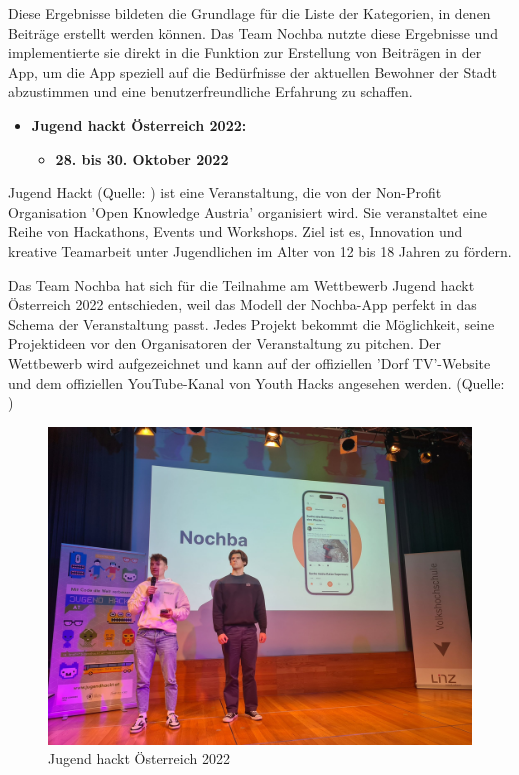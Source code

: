Diese Ergebnisse bildeten die Grundlage für die Liste der Kategorien, in denen Beiträge erstellt werden können. Das Team Nochba nutzte diese Ergebnisse und implementierte sie direkt in die Funktion zur Erstellung von Beiträgen in der App, um die App speziell auf die Bedürfnisse der aktuellen Bewohner der Stadt abzustimmen und eine benutzerfreundliche Erfahrung zu schaffen.

\begin{itemize}
    \item \textbf{Jugend hackt Österreich 2022:}
          \begin{itemize}
              \item \textbf{28. bis 30. Oktober 2022}
          \end{itemize}
\end{itemize}

Jugend Hackt (Quelle: ) ist eine Veranstaltung, die von der Non-Profit Organisation 'Open Knowledge Austria' organisiert wird. Sie veranstaltet eine Reihe von Hackathons, Events und Workshops. Ziel ist es, Innovation und kreative Teamarbeit unter Jugendlichen im Alter von 12 bis 18 Jahren zu fördern.

Das Team Nochba hat sich für die Teilnahme am Wettbewerb Jugend hackt Österreich 2022 entschieden, weil das Modell der Nochba-App perfekt in das Schema der Veranstaltung passt. Jedes Projekt bekommt die Möglichkeit, seine Projektideen vor den Organisatoren der Veranstaltung zu pitchen. Der Wettbewerb wird aufgezeichnet und kann auf der offiziellen 'Dorf TV'-Website und dem offiziellen YouTube-Kanal von Youth Hacks angesehen werden. (Quelle: )


\begin{figure}[H]
    \centering
    \includegraphics[width=1\textwidth]{pics/JugendHackt.jpeg}
    \caption{Jugend hackt Österreich 2022}
    \label{fig:jugendHackt}
\end{figure}

